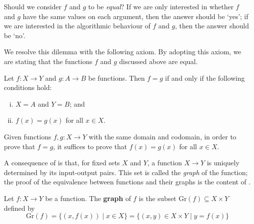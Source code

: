 Should we consider $f$ and $g$ to be \textit{equal}? If we are only interested in whether $f$ and $g$ have the same values on each argument, then the answer should be `yes'; if we are interested in the algorithmic behaviour of $f$ and $g$, then the answer should be `no'.

We resolve this dilemma with the following axiom. By adopting this axiom, we are stating that the functions $f$ and $g$ discussed above are equal.

\begin{axiom}
\label{axFunctionExtensionality}
Let $f : X \to Y$ and $g : A \to B$ be functions. Then $f = g$ if and only if the following conditions hold:
\begin{enumerate}[(i)]
\item $X=A$ and $Y=B$; and
\item $f(x) = g(x)$ for all $x \in X$.
\end{enumerate}
\end{axiom}

\begin{strategy}
\label{strFunctionExtensionality}
Given functions $f, g : X \to Y$ with the same domain and codomain, in order to prove that $f=g$, it suffices to prove that $f(x) = g(x)$ for all $x \in X$.
\end{strategy}

A consequence of  is that, for fixed sets $X$ and $Y$, a function $X \to Y$ is uniquely determined by its input-output pairs. This set is called the \textit{graph} of the function; the proof of the equivalence between functions and their graphs is the content of .

\begin{definition}
\label{defFunctionGraph}
Let $f : X \to Y$ be a function. The \textbf{graph} of $f$ is the subset $\mathrm{Gr}(f) \subseteq X \times Y$  defined by
\[ \mathrm{Gr}(f) = \{ (x, f(x)) \mid x \in X \} = \{ (x,y) \in X \times Y \mid y=f(x) \} \]
\end{definition}

